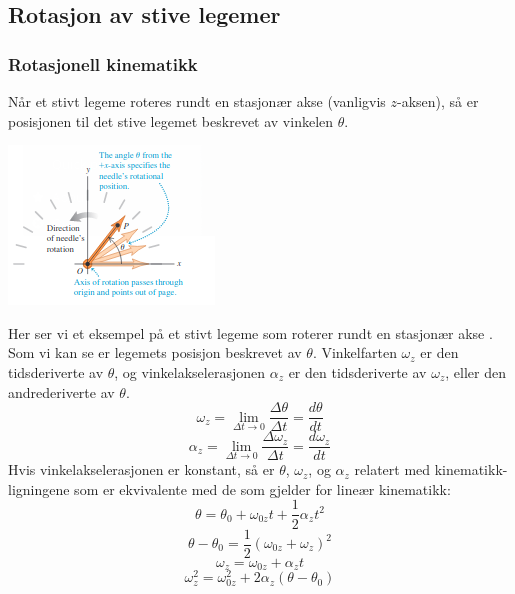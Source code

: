 \graphicspath{ {./bilder/} }

\subsection{Rotasjon av stive legemer}

\subsubsection{Rotasjonell kinematikk}
Når et stivt legeme roteres rundt en stasjonær akse (vanligvis $z$-aksen), så er posisjonen til det stive legemet beskrevet av vinkelen $\theta.$\newline\newline
\begin{center}
\includegraphics{rapport/teori/bilder/theta.png}\newline\newline
\end{center}
Her ser vi et eksempel på et stivt legeme som roterer rundt en stasjonær akse \cite{FYSIKK:1}. Som vi kan se er legemets posisjon beskrevet av $\theta.$\newline\newline
Vinkelfarten $\omega_z$ er den tidsderiverte av $\theta$, og vinkelakselerasjonen $\alpha_z$ er den tidsderiverte av $\omega_z$, eller den andrederiverte av $\theta.$
\begin{equation}
\label{eqn:first}
    \omega_z=\lim_{\Delta t\rightarrow0}{\frac{\Delta\theta}{\Delta t}}=\frac{d\theta}{dt}
\end{equation}
\begin{equation}
    \alpha_z=\lim_{\Delta t\rightarrow0}{\frac{\Delta\omega_z}{\Delta t}}=\frac{d\omega_z}{dt}
\end{equation}
Hvis vinkelakselerasjonen er konstant, så er $\theta$, $\omega_z$, og $\alpha_z$ relatert med kinematikk-ligningene som er ekvivalente med de som gjelder for lineær kinematikk:
\begin{equation}
    \theta=\theta_0+\omega_{0z}t+\frac{1}{2}\alpha_zt^2
\end{equation}
\begin{equation}
    \theta-\theta_0=\frac{1}{2}\left(\omega_{0z}+\omega_z\right)^2
\end{equation}
\begin{equation}
    \omega_z=\omega_{0z}+\alpha_zt
\end{equation}
\begin{equation}
    \omega_z^2=\omega_{0z}^2+2\alpha_z(\theta-\theta_0)
\end{equation}

